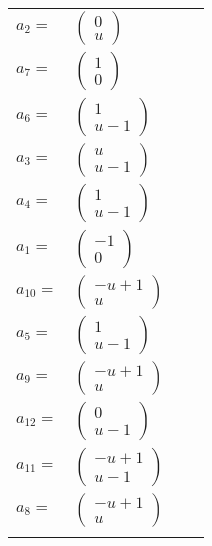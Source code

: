 \documentclass[1p]{elsarticle_modified}
\theoremstyle{definition}
\begin{document}
\begin{tabular}{m{7pt} m{180pt} m{7pt} m{180pt} }
\flushright $a_{2}=$&$\begin{pmatrix}0\\u\end{pmatrix}$ \\
\flushright $a_{7}=$&$\begin{pmatrix}1\\0\end{pmatrix}$ \\
\flushright $a_{6}=$&$\begin{pmatrix}1\\u-1\end{pmatrix}$ \\
\flushright $a_{3}=$&$\begin{pmatrix}u\\u-1\end{pmatrix}$ \\
\flushright $a_{4}=$&$\begin{pmatrix}1\\u-1\end{pmatrix}$ \\
\flushright $a_{1}=$&$\begin{pmatrix}-1\\0\end{pmatrix}$ \\
\flushright $a_{10}=$&$\begin{pmatrix}- u+1\\u\end{pmatrix}$ \\
\flushright $a_{5}=$&$\begin{pmatrix}1\\u-1\end{pmatrix}$ \\
\flushright $a_{9}=$&$\begin{pmatrix}- u+1\\u\end{pmatrix}$ \\
\flushright $a_{12}=$&$\begin{pmatrix}0\\u-1\end{pmatrix}$ \\
\flushright $a_{11}=$&$\begin{pmatrix}- u+1\\u-1\end{pmatrix}$ \\
\flushright $a_{8}=$&$\begin{pmatrix}- u+1\\u\end{pmatrix}$\\&\end{tabular}
\end{document}
